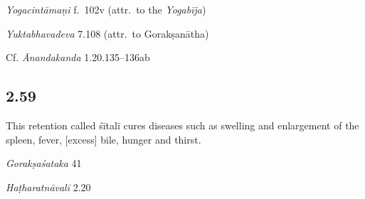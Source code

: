 \begin{ekdosis}
\begin{testimonia}[hp02_058]
\emph{Yogacintāmaṇi} f.~102v (attr.~to the \emph{Yogabīja})
\begin{versinnote}
\end{versinnote}

\emph{Yuktabhavadeva} 7.108 (attr.~to Gorakṣanātha)
\begin{versinnote}
\end{versinnote}

Cf. \emph{Ānandakanda} 1.20.135–136ab
\begin{versinnote}
\end{versinnote}
\end{testimonia}


\subsection*{2.59}
\begin{translation}[hp02_059]
This retention called śītalī cures diseases such as swelling and enlargement of the spleen, fever, [excess] bile, hunger and thirst.
\end{translation}

\begin{sources}[hp02_059]
\emph{Gorakṣaśataka} 41

\begin{versinnote}
\end{versinnote}
\end{sources}

\begin{testimonia}[hp02_059]
\emph{Haṭharatnāvalī} 2.20


\end{testimonia}
\end{ekdosis}
